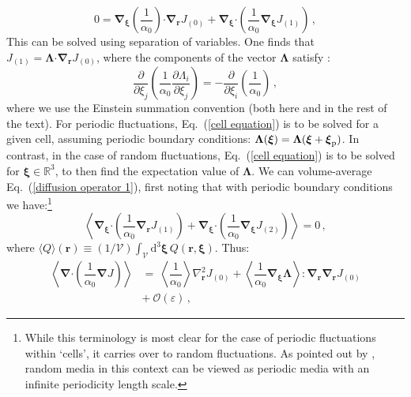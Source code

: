 \documentclass[fleqn,usenatbib]{mnras}
\begin{document}
\begin{equation}
    0 = \boldsymbol{\nabla}_{\boldsymbol{\xi}} \left( \dfrac{1}{\alpha_0} \right)  \boldsymbol{\cdot}  \boldsymbol{\nabla}_{\boldsymbol{r}} J_{(0)} + \boldsymbol{\nabla}_{\boldsymbol{\xi}} \boldsymbol{\cdot} \left( \dfrac{1}{\alpha_0} \boldsymbol{\nabla}_{\boldsymbol{\xi}} J_{(1)}\right) \, \label{J_1 equation O(l^-1)},
\end{equation}
This can be solved using separation of variables. One finds that $J_{(1)} = \boldsymbol{\Lambda} \boldsymbol{\cdot} \boldsymbol{\nabla}_{\boldsymbol{r}} J_{(0)}$, where the components of the vector $\boldsymbol{\Lambda}$ satisfy \citep{Zwillinger1992_Diffeqs, Holmes2013_Perturbation}:
\begin{equation}
    \dfrac{\partial}{\partial \xi_j} \left( \dfrac{1}{\alpha_0} \dfrac{\partial \Lambda_i}{\partial \xi_j} \right) = - \dfrac{\partial}{\partial \xi_i} \left( \dfrac{1}{\alpha_0} \right) \, \label{cell equation},
\end{equation}
where we use the Einstein summation convention (both here and in the rest of the text). For periodic fluctuations, Eq.~(\ref{cell equation}) is to be solved for a given cell, assuming periodic boundary conditions: $\boldsymbol{\Lambda}(\boldsymbol{\xi}) = \boldsymbol{\Lambda}(\boldsymbol{\xi}+\boldsymbol{\xi}_{\rm p})$. In contrast, in the case of random fluctuations, Eq.~(\ref{cell equation}) is to be solved for $\boldsymbol{\xi} \in \mathbb{R}^3$, to then find the expectation value of $\boldsymbol{\Lambda}$. We can volume-average Eq.~(\ref{diffusion operator 1}), first noting that with periodic boundary conditions we have:\footnote{While this terminology is most clear for the case of periodic fluctuations within `cells', it carries over to random fluctuations. As pointed out by \cite{Hanasoge2013}, random media in this context can be viewed as periodic media with an infinite periodicity length scale.} 
\begin{equation}
    \left\langle \boldsymbol{\nabla}_{\boldsymbol{\xi}} \boldsymbol{\cdot} \left( \dfrac{1}{\alpha_0}   \boldsymbol{\nabla}_{\boldsymbol{r}}J_{(1)} \right) + \boldsymbol{\nabla}_{\boldsymbol{\xi}} \boldsymbol{\cdot} \left( \dfrac{1}{\alpha_0} \boldsymbol{\nabla}_{\boldsymbol{\xi}} J_{(2)} \right) \right\rangle = 0 \, ,
\end{equation}
where $\langle Q \rangle (\boldsymbol{r}) \equiv (1/\mathcal{V}) \int_{\mathcal{V}} \textrm{d}^3 \boldsymbol{\xi} \, Q(\boldsymbol{r}, \boldsymbol{\xi})$. Thus:
\begin{align}
    \left\langle \boldsymbol{\nabla} \boldsymbol{\cdot} \left( \dfrac{1}{\alpha_0}  \boldsymbol{\nabla} J  \right) \right\rangle &=~ \left\langle \dfrac{1}{\alpha_0} \right\rangle \nabla_{\boldsymbol{r}}^2 J_{(0)} + \left\langle \dfrac{1}{\alpha_0} \boldsymbol{\nabla}_{\boldsymbol{\xi}} \boldsymbol{\Lambda}  \right\rangle \boldsymbol{:} \boldsymbol{\nabla}_{\boldsymbol{r}} \boldsymbol{\nabla}_{\boldsymbol{r}} J_{(0)} \nonumber \\ &+~ \mathcal{O}(\varepsilon) \, \label{effective diffusion term 1},
\end{align}
\end{document}
